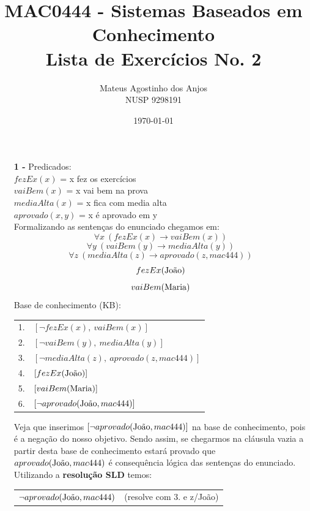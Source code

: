 \documentclass[12pt]{article}
\title{MAC0444 - Sistemas Baseados em Conhecimento \\
Lista de Exercícios No. 2
}
\author{Mateus Agostinho dos Anjos\\NUSP 9298191}
\date{\today}
\begin{document}
	\maketitle
	\begin{itemize}
		\item[\textbf{1 -}]
			\hfill\newline
			Predicados:\\
			$fezEx(x)$ = x fez os exercícios\\
			$vaiBem(x)$ = x vai bem na prova\\
			$mediaAlta(x)$ = x fica com media alta\\
			$aprovado(x, y)$ = x é aprovado em y \\
			\newline
			Formalizando as sentenças do enunciado chegamos em:\\
			$$\forall x \ (fezEx(x) \rightarrow vaiBem(x))$$
			$$\forall y \ (vaiBem(y) \rightarrow mediaAlta(y))$$
			$$\forall z \ (mediaAlta(z) \rightarrow aprovado(z, mac444))$$
			$$fezEx(\textnormal{João})$$
			$$vaiBem(\textnormal{Maria})$$
			Base de conhecimento (KB):\\
			\begin{center}
				\begin{tabular}{c l}
				1. & $[\neg fezEx(x), \ vaiBem(x)]$\\
				2. & $[\neg vaiBem(y), \ mediaAlta(y)]$\\
				3. & $[\neg mediaAlta(z), \ aprovado(z, mac444)] $\\
				4. & $[fezEx(\textnormal{João})]$\\
				5. & $[vaiBem(\textnormal{Maria})]$\\
				6. & $[\neg aprovado(\textnormal{João}, mac444)]$\\
				\end{tabular}
			\end{center}
			Veja que inserimos $[\neg aprovado(\textnormal{João}, mac444)]$ na base de 
			conhecimento, pois	é a negação do nosso objetivo. Sendo assim, se chegarmos na 
			cláusula vazia a partir desta base de conhecimento estará provado que 
			$aprovado(\textnormal{João}, mac444)$ é consequência lógica das sentenças do
			 enunciado.\\
			\newline
			Utilizando a \textbf{resolução SLD} temos:\\
			\begin{center}
				\begin{tabular}{c c}
					$\neg aprovado(\textnormal{João}, mac444)$ & (resolve com 3. e z/João)\\

\end{tabular}
\end{center}
\end{itemize}
\end{document}
